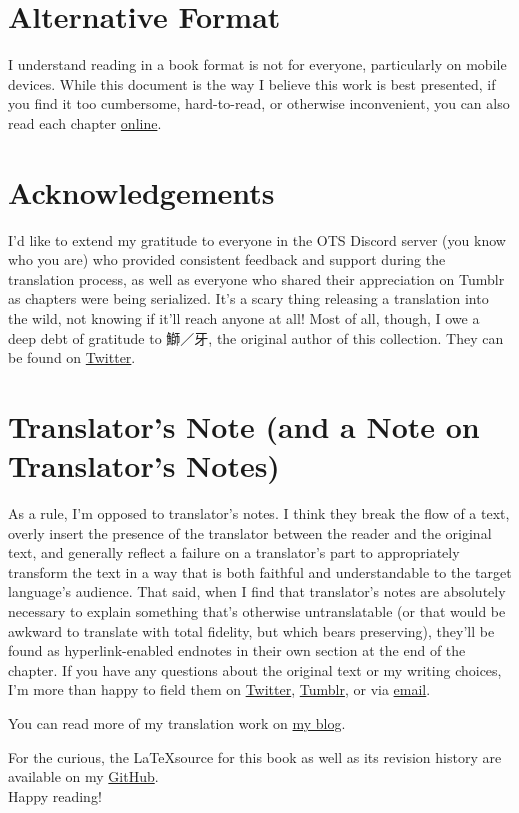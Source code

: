 \section*{Alternative Format}
I understand reading in a book format is not for everyone, particularly on mobile devices. While this document is the way I believe this work is best presented, if you find it too cumbersome, hard-to-read, or otherwise inconvenient, you can also read each chapter \href{https://lynne.bearblog.dev/blog/?q=octo84}{online}.

\section*{Acknowledgements}
I'd like to extend my gratitude to everyone in the OTS Discord server (you know who you are) who provided consistent feedback and support during the translation process, as well as everyone who shared their appreciation on Tumblr as chapters were being serialized. It's a scary thing releasing a translation into the wild, not knowing if it'll reach anyone at all! Most of all, though, I owe a deep debt of gratitude to 鰤／牙, the original author of this collection. They can be found on \href{https://twitter.com/kiva_blitz}{Twitter}.

\section*{Translator's Note (and a Note on Translator's Notes)}
As a rule, I'm opposed to translator's notes. I think they break the flow of a text, overly insert the presence of the translator between the reader and the original text, and generally reflect a failure on a translator's part to appropriately transform the text in a way that is both faithful and understandable to the target language's audience. That said, when I find that translator's notes are absolutely necessary to explain something that's otherwise untranslatable (or that would be awkward to translate with total fidelity, but which bears preserving), they'll be found as hyperlink-enabled endnotes in their own section at the end of the chapter.
If you have any questions about the original text or my writing choices, I'm more than happy to field them on \href{https://twitter.com/plvpwaa}{Twitter}, \href{https://plvpwaa.tumblr.com}{Tumblr}, or via \href{mailto:plvpwaa@lynnux.org}{email}.

You can read more of my translation work on \href{https://lynne.bearblog.dev}{my blog}. 

For the curious, the \LaTeX \space source for this book as well as its revision history are available on my \href{https://github.com/Spirati/translation-octopath}{GitHub}.
\\

Happy reading!
